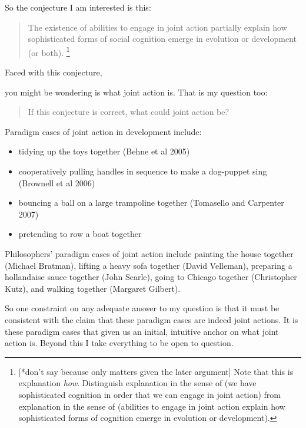\documentclass[12pt,a4paper]{extarticle}
\begin{document}
So the conjecture I am interested is this:
%
\begin{quote}
The existence of abilities to engage in joint action partially explain how sophisticated forms of social cognition emerge in evolution or development (or both).%
\footnote{
[*don't say because only matters given the later argument]
Note that this is explanation \emph{how}.  
Distinguish explanation in the sense of (we have sophisticated cognition in order that we can engage in joint action) from explanation in the sense of (abilities to engage in joint action explain how sophisticated forms of cognition emerge in evolution or development).
}
\end{quote}
%
Faced with this conjecture, 
\begin{comment}
you might be wondering two things.
The first is what `sophisticated forms of social cognition' are.
I'll say more about this later; to anticipate, I will argue that ascriptions of beliefs, desires, intentions and other propositional attitudes are instances of sophisticated social cognition.
The other thing 
\end{comment}
you might be wondering is what joint action is.
That is my question too:
%
\begin{quote}
If this conjecture is correct, what could joint action be?
\end{quote}
%
Paradigm cases of joint action in development include:
%
\begin{itemize}
\item tidying up the toys together 
(Behne et al 2005)
\item cooperatively pulling handles in sequence to make a dog-puppet sing 
(Brownell et al 2006)
\item bouncing a ball on a large trampoline together 
(Tomasello and Carpenter 2007)
\item pretending to row a boat together
\end{itemize}
%
Philosophers' paradigm cases of joint action include painting the house together (Michael Bratman), lifting a heavy sofa together (David Velleman), preparing a hollandaise sauce together (John Searle), going to Chicago together (Christopher Kutz), and walking together (Margaret Gilbert).


So one constraint on any adequate answer to my question is that it must be consistent with the claim that these paradigm cases are indeed joint actions.
It is  these paradigm cases that given us an initial, intuitive anchor on what joint action is.
Beyond this I take everything to be open to question.
\end{document}
